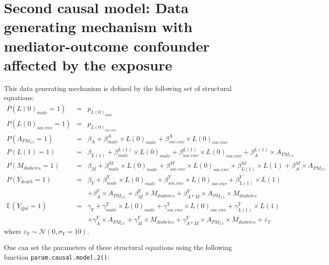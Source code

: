 \documentclass[
]{book}
\begin{document}
\section{Second causal model: Data generating mechanism with mediator-outcome confounder affected by the exposure}\label{second-causal-model-data-generating-mechanism-with-mediator-outcome-confounder-affected-by-the-exposure}

This data generating mechanism is defined by the following set of structural equations:
\[\begin{array}{lll}
P(L(0)_{male} = 1) &=& p_{L(0)_{male}}\\
P(L(0)_{soc.env} = 1) &=& p_{L(0)_{soc.env}}\\
P(A_{PM_{2.5}} = 1) &=& \beta_{A} + \beta_{male}^A \times L(0)_{male} + \beta_{soc.env}^A \times L(0)_{soc.env}\\
P(L(1) = 1) &=& \beta_{L(1)} + \beta_{male}^{L(1)} \times L(0)_{male} + \beta_{soc.env}^{L(1)} \times L(0)_{soc.env} + \beta_{A}^{L(1)} \times A_{PM_{2.5}}\\
P(M_{diabetes} = 1) &=& \beta_{M} + \beta_{male}^M \times L(0)_{male} + \beta_{soc.env}^M \times L(0)_{soc.env} + \beta_{L(1)}^M \times L(1) + \beta_{A}^M \times A_{PM_{2.5}}\\
P(Y_{death} = 1) &=& \beta_{Y} + \beta_{male}^Y \times L(0)_{male} + \beta_{soc.env}^Y \times L(0)_{soc.env} + \beta_{L(1)}^Y \times L(1)\\
                 & & + \beta_{A}^Y \times A_{PM_{2.5}} + \beta_{M}^Y \times M_{diabetes} + \beta_{A \ast M }^Y \times A_{PM_{2.5}} \times M_{diabetes}\\
\mathbb{E}(Y_{Qol} = 1) &=& \gamma_{Y} + \gamma_{male}^Y \times L(0)_{male} + \gamma_{soc.env}^Y \times L(0)_{soc.env} + \gamma_{L(1)}^Y \times L(1)\\
                        & &+ \gamma_{A}^Y \times A_{PM_{2.5}} + \gamma_{M}^Y \times M_{diabetes} + \gamma_{A \ast M }^Y \times A_{PM_{2.5}} \times M_{diabetes} + \varepsilon_Y
\end{array}\]
where \(\varepsilon_Y \sim \mathcal{N}(0,\sigma_Y = 10)\).

One can set the parameters of these structural equations using the following function \texttt{param.causal.model.2()}:
\end{document}
